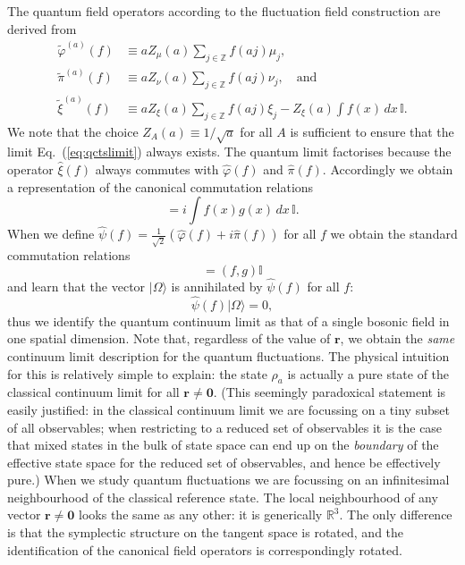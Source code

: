 \documentclass[prl,twocolumn,lengthcheck,superscriptaddress]{revtex4-1}
\theoremstyle{definition}
\theoremstyle{remark}
\begin{document}
The quantum field operators according to the fluctuation field construction are derived from
\begin{equation}
	\begin{split}
		\widetilde{\varphi}^{(a)}(f) &\equiv aZ_{\mu}(a) \sum_{j\in \mathbb{Z}} f(aj) \mu_j,\\
		\widetilde{\pi}^{(a)}(f) &\equiv aZ_{\nu}(a) \sum_{j\in \mathbb{Z}} f(aj) \nu_j, \quad \text{and}\\
		\widetilde{\xi}^{(a)}(f) &\equiv aZ_{\xi}(a) \sum_{j\in \mathbb{Z}} f(aj) \xi_j - Z_{\xi}(a) \int f(x) \,dx\, \mathbb{I}.
	\end{split}
\end{equation}
We note that the choice $Z_A(a) \equiv 1/\sqrt{a}$ for all $A$ is sufficient to ensure that the limit Eq.~(\ref{eq:qctslimit}) always exists. The quantum limit factorises because the operator $\widehat{\xi}(f)$ always commutes with $\widehat{\varphi}(f)$ and $\widehat{\pi}(f)$. Accordingly we obtain a representation of the canonical commutation relations  
\begin{equation}
	[\widehat{\varphi}(f), \widehat{\pi}(g)] = i \int f(x)g(x)\,dx\, \mathbb{I}.
\end{equation}
When we define $\widehat{\psi}(f) = \frac{1}{\sqrt2}(\widehat{\varphi}(f) + i \widehat{\pi}(f))$ for all $f$ we obtain the standard commutation relations
\begin{equation}
	[\widehat{\psi}(f), \widehat{\psi}^\dag(g)] = (f,g)\mathbb{I}
\end{equation}
and learn that the vector $|\Omega\rangle$ is annihilated by $\widehat{\psi}(f)$ for all $f$:
\begin{equation}
	\widehat{\psi}(f)|\Omega\rangle = 0,
\end{equation}
thus we identify the quantum continuum limit as that of a single bosonic field in one spatial dimension. Note that, regardless of the value of $\mathbf{r}$, we obtain the \emph{same} continuum limit description for the quantum fluctuations. The physical intuition for this is relatively simple to explain: the state $\rho_a$ is actually a pure state of the classical continuum limit for all  $\mathbf{r}\not=\mathbf{0}$. (This seemingly paradoxical statement is easily justified: in the classical continuum limit we are focussing on a tiny subset of all observables; when restricting to a reduced set of observables it is the case that mixed states in the bulk of state space can end up on the \emph{boundary} of the effective state space for the reduced set of observables, and hence be effectively pure.) When we study quantum fluctuations we are focussing on an infinitesimal neighbourhood of the classical reference state. The local neighbourhood of any vector $\mathbf{r}\not=\mathbf{0}$ looks the same as any other: it is generically $\mathbb{R}^3$. The only difference is that the symplectic structure on the tangent space is rotated, and the identification of the canonical field operators is correspondingly rotated.
\end{document}
